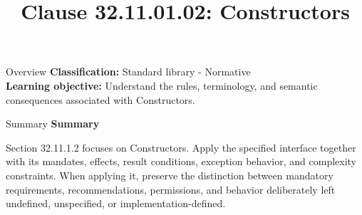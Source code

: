 \documentclass[10pt,letterpaper]{article}
\title{Clause 32.11.01.02: Constructors}
\author{}
\date{}
\begin{document}
\maketitle
\begin{CornellOverviewBox}{Overview}
\textbf{Classification:} Standard library - Normative\\[2pt]
\textbf{Learning objective:} Understand the rules, terminology, and semantic consequences associated with Constructors.
\end{CornellOverviewBox}\begin{CornellSummaryBox}{Summary}
{\sffamily\bfseries\color{Accent} Summary}\par\vspace{3pt}Section 32.11.1.2 focuses on Constructors. Apply the specified interface together with its mandates, effects, result conditions, exception behavior, and complexity constraints. When applying it, preserve the distinction between mandatory requirements, recommendations, permissions, and behavior deliberately left undefined, unspecified, or implementation-defined.
\end{CornellSummaryBox}
\end{document}
